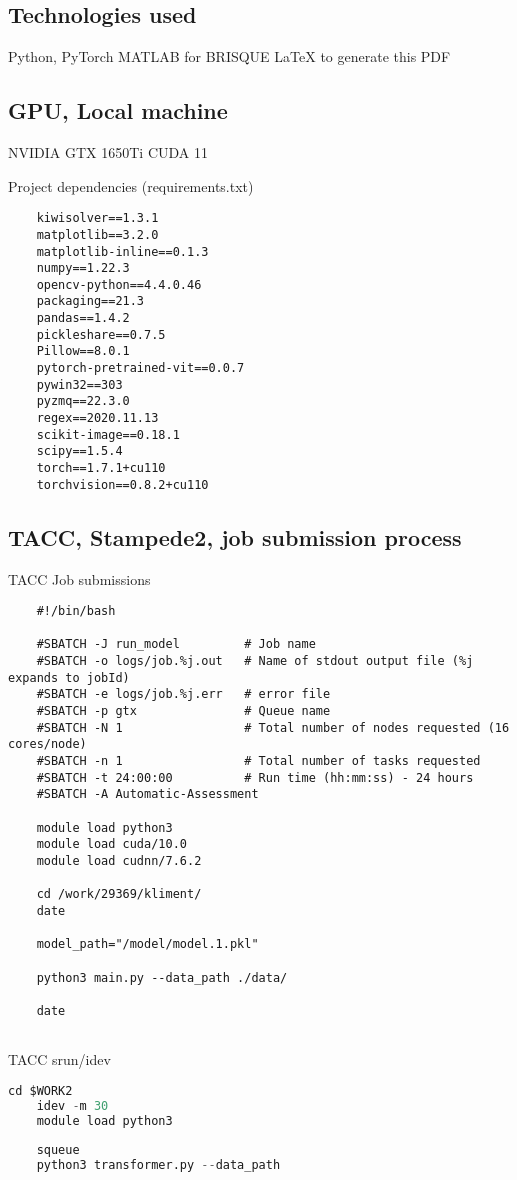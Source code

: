 \subsection{Technologies used}

Python, PyTorch
MATLAB for BRISQUE
LaTeX to generate this PDF

\subsection{GPU, Local machine}

NVIDIA GTX 1650Ti
CUDA 11

Project dependencies (requirements.txt)

\scriptsize
\begin{verbatim}
    kiwisolver==1.3.1
    matplotlib==3.2.0
    matplotlib-inline==0.1.3
    numpy==1.22.3
    opencv-python==4.4.0.46
    packaging==21.3
    pandas==1.4.2
    pickleshare==0.7.5
    Pillow==8.0.1
    pytorch-pretrained-vit==0.0.7
    pywin32==303
    pyzmq==22.3.0
    regex==2020.11.13
    scikit-image==0.18.1
    scipy==1.5.4
    torch==1.7.1+cu110
    torchvision==0.8.2+cu110
\end{verbatim}
\normalsize	

\subsection{TACC, Stampede2, job submission process}

TACC Job submissions

\scriptsize
\begin{verbatim}
    #!/bin/bash

    #SBATCH -J run_model         # Job name
    #SBATCH -o logs/job.%j.out   # Name of stdout output file (%j expands to jobId)
    #SBATCH -e logs/job.%j.err   # error file
    #SBATCH -p gtx               # Queue name
    #SBATCH -N 1                 # Total number of nodes requested (16 cores/node)
    #SBATCH -n 1                 # Total number of tasks requested
    #SBATCH -t 24:00:00          # Run time (hh:mm:ss) - 24 hours
    #SBATCH -A Automatic-Assessment
    
    module load python3
    module load cuda/10.0
    module load cudnn/7.6.2
    
    cd /work/29369/kliment/
    date
    
    model_path="/model/model.1.pkl"
    
    python3 main.py --data_path ./data/ 
    
    date
    
\end{verbatim}
\normalsize	

TACC srun/idev


\small
\begin{lstlisting}[keywordstyle=\color{blue},language=Python]
    cd $WORK2
    idev -m 30
    module load python3
    
    squeue
    python3 transformer.py --data_path 
\end{lstlisting}
\normalsize	